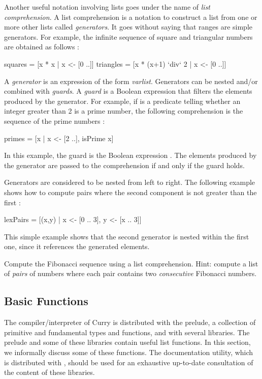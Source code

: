 Another useful notation involving lists goes under the name of
\emph{list comprehension}.
A list comprehension is a notation to construct a list from
one or more other lists called
\emph{generators}.
It goes without saying that ranges are simple generators.
For example, the infinite sequence of square and triangular
numbers are obtained as follows
:
%
\begin{curry}
squares   = [x * x | x <- [0 ..]]
triangles = [x * (x+1) `div` 2 | x <- [0 ..]]
\end{curry}
%
A \emph{generator}
is an expression of the form
\emph{var}\code{\,<-\,}\emph{list}.
Generators can be nested and/or combined with \emph{guards}.
A \emph{guard}
is a Boolean expression that filters the elements
produced by the generator.
For example, if  is a predicate telling whether
an integer greater than 2 is a prime number, the following
comprehension is the sequence of the prime numbers
:
%
\begin{curry}
primes = [x | x <- [2 ..], isPrime x] 
\end{curry}
%
In this example, the guard is the Boolean expression
. The elements produced by the generator
are passed to the comprehension if and only if the guard holds.

Generators are considered to be nested from left to right.
The following example shows how to compute pairs where
the second component is not greater than the first
:
%
\begin{curry}
lexPairs = [(x,y) | x <- [0 .. 3], y <- [x .. 3]]
\end{curry}
%
This simple example shows that the second generator
 is nested within
the first one, since it references the generated elements.
%
\begin{exercise}
Compute the Fibonacci sequence using a list comprehension.
Hint: compute a list of \emph{pairs} of numbers where
each pair contains two \emph{consecutive} Fibonacci numbers.
\end{exercise}

\subsection{Basic Functions}
\label{basic-list-function}

The \pakcs{} compiler/interpreter of Curry is distributed
with the prelude, a collection of primitive and
fundamental types and functions, and with several libraries.
The prelude and some of these libraries contain
useful list functions.
In this section, we informally discuss some of these functions.
The 
documentation utility, which is
distributed with \pakcs, should be used for an exhaustive
up-to-date consultation of the content of these libraries.

